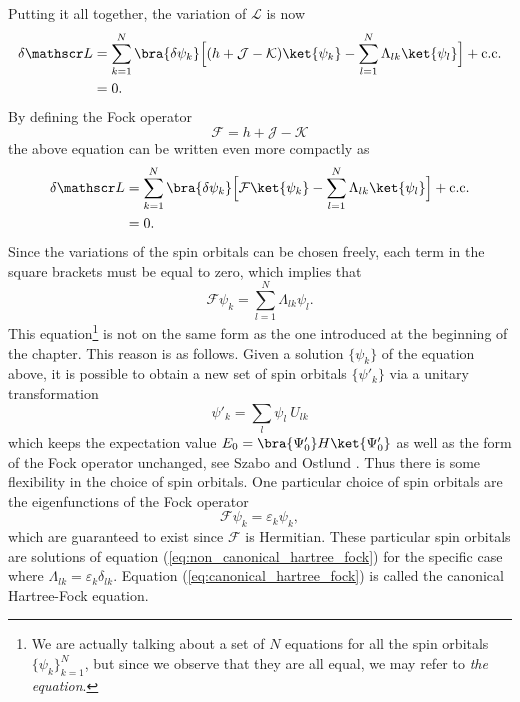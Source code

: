 Putting it all together, the variation of $\mathscr L$ is now
\begin{equation}
\begin{split}
 \delta \mathscr L &  = \sum_{k=1}^N\bra{\delta \psi_k}\Big[ (h + \mathcal J - \mathcal K)\ket{\psi_k}
                     - \sum_{l=1}^N\Lambda_{lk}\ket{\psi_l}\Big] + \text{c.c.} \\
                   & = 0.
\end{split}
\end{equation}
By defining the Fock operator
\begin{equation}
\label{eq:Fock_operator}
\mathcal{F} = h + \mathcal J - \mathcal K
\end{equation}
the above equation can be written even more compactly as
\begin{equation}
\begin{split}
  \delta \mathscr L & =\sum_{k=1}^N\bra{\delta \psi_k}\Big[\mathcal F\ket{\psi_k}
                       - \sum_{l=1}^N\Lambda_{lk}\ket{\psi_l}\Big] + \text{c.c.} \\
                    & = 0.
\end{split}
\end{equation}
Since the variations of the spin orbitals can be chosen freely, each term
in the square brackets must be equal to zero, which implies that
\begin{equation}
\label{eq:non_canonical_hartree_fock}
 \mathcal F\psi_k = \sum_{l=1}^N\Lambda_{lk}\psi_l.
\end{equation}
This equation\footnote{We are actually talking about a set of $N$ equations for all the spin orbitals
$\{\psi_k\}_{k=1}^N$, but since we observe that they are all equal, we may refer to \emph{the equation}.}
is not on the same form as the one introduced at the beginning of the chapter. This reason is as follows.
Given a solution $\{\psi_k\}$ of the equation above, it is possible to obtain a new set of spin orbitals
$\{\psi'_k\}$ via a unitary transformation
\begin{equation}
 \psi'_k = \sum_l \psi_l\ U_{lk}
\end{equation}
which keeps the expectation value $E_0 = \bra{\Psi'_0}H\ket{\Psi'_0}$ as well as the form of the Fock operator
unchanged, see Szabo and Ostlund \cite{Szabo}. Thus there is some flexibility in the choice of spin orbitals.
One particular choice of spin orbitals are the eigenfunctions of the Fock operator
\begin{equation}
\label{eq:canonical_hartree_fock}
 \mathcal F\psi_k = \varepsilon_k\psi_k,
\end{equation}
which are guaranteed to exist since $\mathcal F$ is Hermitian.
These particular spin orbitals are solutions of equation (\ref{eq:non_canonical_hartree_fock}) for the specific case where
$\Lambda_{lk} = \varepsilon_k\delta_{lk}$. Equation (\ref{eq:canonical_hartree_fock}) is called the canonical Hartree-Fock
equation.


